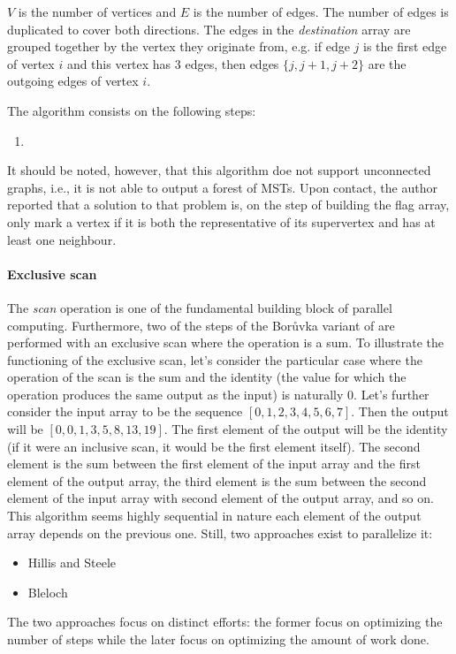 $V$ is the number of vertices and $E$ is the number of edges. The number of edges is duplicated to cover both directions. The edges in the \emph{destination} array are grouped together by the vertex they originate from, e.g. if edge $j$ is the first edge of vertex $i$ and this vertex has 3 edges, then edges $\{j,j+1,j+2\}$ are the outgoing edges of vertex $i$.



The algorithm consists on the following steps:

\begin{enumerate}
	\item 
\end{enumerate}


It should be noted, however, that this algorithm doe not support unconnected graphs, i.e., it is not able to output a forest of MSTs.
Upon contact, the author reported that a solution to that problem is, on the step of building the flag array, only mark a vertex if it is both the representative of its supervertex and has at least one neighbour.



\paragraph{Exclusive scan} The \emph{scan} operation is one of the fundamental building block of parallel computing. 
Furthermore, two of the steps of the Borůvka variant of \cite{Sousa2015} are performed with an exclusive scan where the operation is a sum. 
To illustrate the functioning of the exclusive scan, let's consider the particular case where the operation of the scan is the sum and the identity (the value for which the operation produces the same output as the input) is naturally $0$. Let's further consider the input array to be the sequence $[0,1,2,3,4,5,6,7]$. Then the output will be $[0,0,1,3,5,8,13,19]$. The first element of the output will be the identity (if it were an inclusive scan, it would be the first element itself). The second element is the sum between the first element of the input array and the first element of the output array, the third element is the sum between the second element of the input array with second element of the output array, and so on.
This algorithm seems highly sequential in nature each element of the output array depends on the previous one. 
Still, two approaches exist to parallelize it:

\begin{itemize} 
	\item Hillis and Steele
	\item Bleloch
\end{itemize}

The two approaches focus on distinct efforts: the former focus on optimizing the number of steps while the later focus on optimizing the amount of work done.




